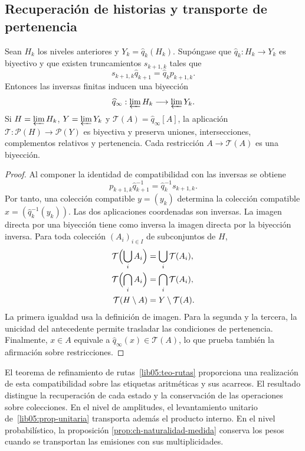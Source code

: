 \subsection{Recuperación de historias y transporte de pertenencia}
\begin{proposition}
\label{lib07:prop-familias}
Sean \(H_k\) los niveles anteriores y \(Y_k=\widehat q_k(H_k)\).
Supóngase que \(\widehat q_k:H_k\to Y_k\) es biyectivo y que existen
truncamientos \(s_{k+1,k}\) tales que
\[
 s_{k+1,k}\widehat q_{k+1}=\widehat q_k p_{k+1,k}.
\]
Entonces las inversas finitas inducen una biyección
\[
 \widehat q_\infty:\varprojlim H_k\longrightarrow\varprojlim Y_k.
\]
Si \(H=\varprojlim H_k\), \(Y=\varprojlim Y_k\) y
\(\mathcal T(A)=\widehat q_\infty[A]\), la aplicación
\(\mathcal T:\mathcal P(H)\to\mathcal P(Y)\) es biyectiva y
preserva uniones, intersecciones, complementos relativos y pertenencia.
Cada restricción \(A\to\mathcal T(A)\) es una biyección.
\end{proposition}
\begin{proof}
Al componer la identidad de compatibilidad con las inversas se obtiene
\[
 p_{k+1,k}\widehat q_{k+1}^{-1}
   =\widehat q_k^{-1}s_{k+1,k}.
\]
Por tanto, una colección compatible \(y=(y_k)\) determina la colección
compatible \(x=(\widehat q_k^{-1}(y_k))\). Las dos aplicaciones
coordenadas son inversas. La imagen directa por una biyección tiene
como inversa la imagen directa por la biyección inversa. Para toda
colección \((A_i)_{i\in I}\) de subconjuntos de \(H\),
\[
 \begin{aligned}
 \mathcal T\Bigl(\bigcup_i A_i\Bigr)&=\bigcup_i\mathcal T(A_i),\\
 \mathcal T\Bigl(\bigcap_i A_i\Bigr)&=\bigcap_i\mathcal T(A_i),\\
 \mathcal T(H\setminus A)&=Y\setminus\mathcal T(A).
 \end{aligned}
\]
La primera igualdad usa la definición de imagen. Para la segunda y
la tercera, la unicidad del antecedente permite trasladar las
condiciones de pertenencia. Finalmente,
\(x\in A\) equivale a
\(\widehat q_\infty(x)\in\mathcal T(A)\), lo que prueba también
la afirmación sobre restricciones.
\end{proof}

El teorema de refinamiento de rutas~\ref{lib05:teo-rutas}
proporciona una realización de esta compatibilidad sobre las etiquetas
aritméticas y sus acarreos. El resultado distingue la recuperación
de cada estado y la conservación de las operaciones sobre colecciones.
En el nivel de amplitudes, el levantamiento unitario
de~\ref{lib05:prop-unitaria} transporta además el producto interno.
En el nivel probabilístico, la proposición
\ref{prop:ch-naturalidad-medida} conserva los pesos cuando se
transportan las emisiones con sus multiplicidades.

